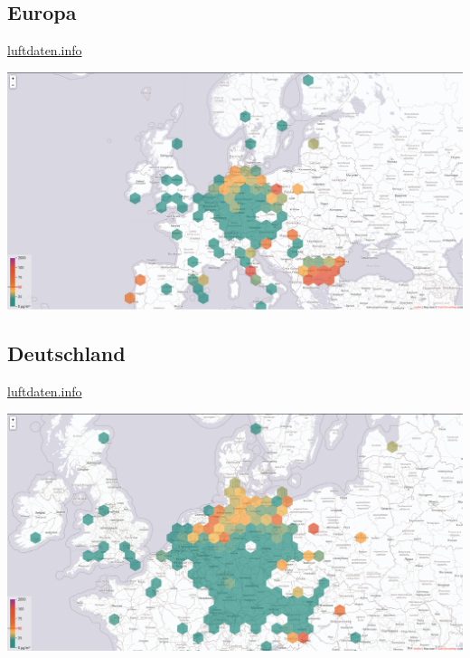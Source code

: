 \documentclass[aspectratio=169]{beamer} %
\begin{document}
\subsection{Europa}
\begin{frame}{\href{http://hannover.maps.luftdaten.info/\#5/52.373/10.005}{luftdaten.info}}
  \begin{center}
    \includegraphics[width=\textwidth]{../screenshots/luftdaten-zoom-e.png}
  \end{center}
\end{frame}
\subsection{Deutschland}
\begin{frame}{\href{http://hannover.maps.luftdaten.info/\#6/52.373/10.005}{luftdaten.info}}
  \begin{center}
    \includegraphics[width=\textwidth]{../screenshots/luftdaten-zoom-f.png}
  \end{center}
\end{frame}
\end{document}
